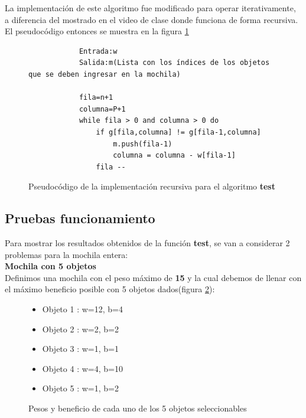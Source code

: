     La implementación de este algoritmo fue modificado para operar iterativamente, a diferencia del mostrado en el video de clase donde funciona de forma recursiva. El pseudocódigo entonces se muestra en la figura \ref{PseudocodigoTest}
    
    \begin{figure}[h!]
        \centering
        \begin{verbatim}
            Entrada:w
            Salida:m(Lista con los índices de los objetos que se deben ingresar en la mochila)
            
            fila=n+1
            columna=P+1
            while fila > 0 and columna > 0 do
                if g[fila,columna] != g[fila-1,columna]
                    m.push(fila-1)
                    columna = columna - w[fila-1]
                fila --
        \end{verbatim}
        \caption{Pseudocódigo de la implementación recursiva para el algoritmo \textbf{test}}
        \label{PseudocodigoTest}
    \end{figure}
    
    \subsection*{Pruebas funcionamiento}
        Para mostrar los resultados obtenidos de la función \textbf{test}, se van a considerar 2 problemas para la mochila entera:\\
        
        \textbf{Mochila con 5 objetos}\\
        
            Definimos una mochila con el peso máximo de \textbf{15} y la cual debemos de llenar con el máximo beneficio posible con 5 objetos dados(figura \ref{MochilaObjetos5}):
            
            \begin{figure}[h!]
                \centering
                    \begin{itemize}
                        \item Objeto 1 : w=12, b=4
                        \item Objeto 2 : w=2, b=2
                        \item Objeto 3 : w=1, b=1
                        \item Objeto 4 : w=4, b=10
                        \item Objeto 5 : w=1, b=2 
                    \end{itemize}
                \caption{Pesos y beneficio de cada uno de los 5 objetos seleccionables}
                \label{MochilaObjetos5}
            \end{figure}
            
